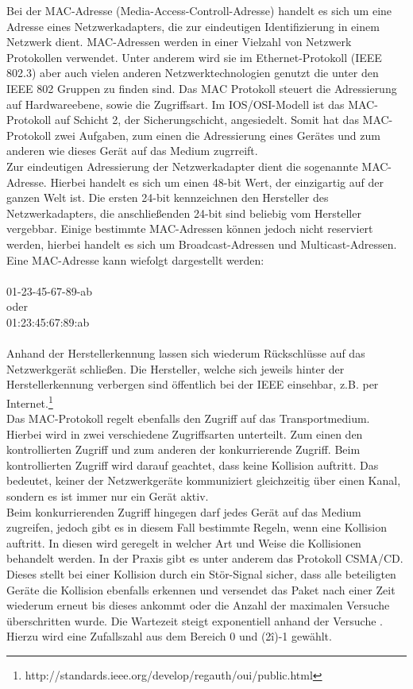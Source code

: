 Bei der MAC-Adresse (Media-Access-Controll-Adresse) handelt es sich um eine Adresse eines Netzwerkadapters, die zur eindeutigen Identifizierung in einem Netzwerk dient. MAC-Adressen werden in einer Vielzahl von Netzwerk Protokollen verwendet. Unter anderem wird sie im Ethernet-Protokoll (IEEE 802.3)  aber auch vielen anderen Netzwerktechnologien genutzt die unter den IEEE 802 Gruppen zu finden sind.
Das MAC Protokoll steuert die Adressierung auf Hardwareebene, sowie die Zugriffsart.
Im IOS/OSI-Modell ist das MAC-Protokoll auf Schicht 2, der Sicherungschicht, angesiedelt.
Somit hat das MAC-Protokoll zwei Aufgaben, zum einen die Adressierung eines Gerätes und zum anderen wie dieses Gerät auf das Medium zugrreift.\\
Zur eindeutigen Adressierung der Netzwerkadapter  dient die sogenannte MAC-Adresse. Hierbei handelt es sich um einen 48-bit Wert, der einzigartig auf der ganzen Welt ist. Die ersten 24-bit kennzeichnen den Hersteller des Netzwerkadapters, die anschließenden 24-bit sind beliebig vom Hersteller vergebbar. Einige bestimmte MAC-Adressen können jedoch nicht reserviert werden, hierbei handelt  es sich um Broadcast-Adressen und Multicast-Adressen.
Eine MAC-Adresse kann wiefolgt dargestellt werden:\\
\\
01-23-45-67-89-ab\\
oder\\
01:23:45:67:89:ab\\
\\
Anhand der Herstellerkennung lassen sich wiederum Rückschlüsse auf das Netzwerkgerät schließen. Die Hersteller, welche sich jeweils hinter der Herstellerkennung verbergen sind öffentlich bei der IEEE einsehbar, z.B. per Internet.\footnote{http://standards.ieee.org/develop/regauth/oui/public.html}\\
Das MAC-Protokoll regelt ebenfalls den Zugriff auf das Transportmedium. Hierbei wird in zwei verschiedene Zugriffsarten unterteilt. Zum einen den kontrollierten Zugriff und zum anderen der konkurrierende Zugriff.
Beim kontrollierten Zugriff wird darauf geachtet, dass keine Kollision auftritt. Das bedeutet, keiner der Netzwerkgeräte kommuniziert gleichzeitig über einen Kanal, sondern es ist immer nur ein Gerät aktiv.\\
Beim konkurrierenden Zugriff hingegen darf jedes Gerät auf das Medium zugreifen, jedoch gibt es in diesem Fall bestimmte Regeln, wenn eine Kollision auftritt. In diesen wird geregelt in welcher Art und Weise die Kollisionen behandelt werden. In der Praxis gibt es unter anderem das Protokoll CSMA/CD. Dieses stellt bei einer Kollision durch ein Stör-Signal sicher, dass alle beteiligten Geräte die Kollision ebenfalls erkennen und versendet das Paket nach einer Zeit wiederum erneut bis dieses ankommt oder die Anzahl der maximalen Versuche überschritten wurde. Die Wartezeit steigt exponentiell anhand der Versuche . Hierzu wird eine Zufallszahl aus dem Bereich 0 und (2\^i)-1 gewählt.

